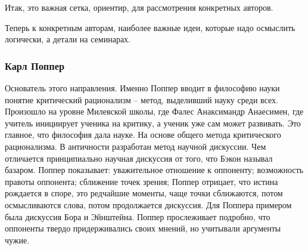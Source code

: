 \documentclass[a4paper, 12pt]{article}
\begin{document}
Итак, это важная сетка, ориентир, для рассмотрения конкретных авторов.

Теперь к конкретным авторам, наиболее важные идеи, которые надо 
осмыслить логически, а детали на семинарах.

\subsubsection{Карл Поппер}

Основатель этого направления. Именно Поппер вводит в философию науки 
понятие критический рационализм -- метод, выделивший науку среди всех. 
Произошло на уровне Милевской школы, где Фалес Анаксимандр Анаесимен, 
где учитель инициирует ученика на критику, а ученик уже сам может 
развивать. Это главное, что философия дала науке. На основе общего 
метода критического рационализма. В античности разработан метод научной 
дискуссии. Чем отличается принципиально научная дискуссия от того, что 
Бэкон называл базаром. Поппер показывает: уважительное отношение 
к оппоненту; возможность правоты оппонента; сближение точек зрения; 
Поппер отрицает, что истина рождается в споре, это редчайшие моменты, 
чаще точки сближаются, потом осмысливаются слова, потом продолжается 
дискуссия. Для Поппера примером была дискуссия Бора и Эйнштейна. Поппер 
прослеживает подробно, что оппоненты твердо придерживались своих мнений, 
но учитывали аргументы чужие.
\end{document}
